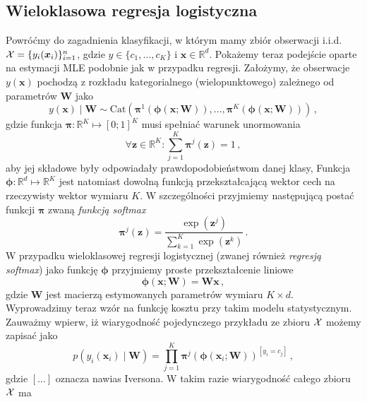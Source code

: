 \documentclass{myclass}
\numberwithin{equation}{subsection}
\begin{document}
\subsection{Wieloklasowa regresja logistyczna}

Powróćmy do zagadnienia klasyfikacji, w którym mamy zbiór obserwacji i.i.d. \(\mathcal{X} =
\{y_i(\bm{x}_i)\}_{i=1}^n\), gdzie \(y \in \{c_1,\ldots,c_K\}\) i \(\bm{x} \in \mathbb{R}^d\).
Pokażemy teraz podejście oparte na estymacji MLE podobnie jak w przypadku regresji. Założymy, że
obserwacje \(y(\bm{x})\) pochodzą z rozkładu kategorialnego (wielopunktowego) zależnego od
parametrów \(\bm{W}\) jako
\begin{equation}
    y(\bm{x}) \mid \bm{W} \sim \mathrm{Cat}\left(\bm{\pi}^1(\bm{\phi}(\bm{x}; \bm{W})), \ldots, \bm{\pi}^K(\bm{\phi}(\bm{x}; \bm{W}))\right)\,,
\end{equation}
gdzie funkcja \(\bm{\pi}: \mathbb{R}^K \mapsto [0;1]^K\) musi spełniać warunek unormowania
\begin{equation*}
    \forall \bm{z}\in\mathbb{R}^K: \sum_{j=1}^K \bm{\pi}^j(\bm{z}) = 1\,,
\end{equation*}
aby jej składowe były odpowiadały prawdopodobieństwom danej klasy, Funkcja \(\bm{\phi}: \mathbb{R}^d
\mapsto \mathbb{R}^K\) jest natomiast dowolną funkcją przekształcającą wektor cech na rzeczywisty
wektor wymiaru \(K\). W szczególności przyjmiemy następującą postać funkcji \(\bm{\pi}\) zwaną
\emph{funkcją softmax}
\begin{equation}\boxed{
    \bm{\pi}^j(\bm{z}) = \frac{\exp\left(\bm{z}^j\right)}{\sum_{k=1}^K \exp\left(\bm{z}^k\right)}\,.
}\end{equation}
W przypadku wieloklasowej regresji logistycznej (zwanej również \emph{regresją softmax}) jako
funkcję \(\bm{\phi}\) przyjmiemy proste przekształcenie liniowe
\begin{equation}
    \bm{\phi}(\bm{x}; \bm{W}) = \bm{W}\bm{x}\,,
\end{equation} 
gdzie \(\bm{W}\) jest macierzą estymowanych parametrów wymiaru \(K \times d\). Wyprowadzimy teraz
wzór na funkcję kosztu przy takim modelu statystycznym. Zauważmy wpierw, iż wiarygodność
pojedynczego przykładu ze zbioru \(\mathcal{X}\) możemy zapisać jako
\begin{equation}
    p(y_i(\bm{x}_i) \mid \bm{W}) = \prod_{j=1}^K \bm{\pi}^j\left(\bm{\phi}(\bm{x}_i; \bm{W})\right)^{[y_i = c_j]}\,,
\end{equation}
gdzie \([\ldots]\) oznacza nawias Iversona. W takim razie wiarygodność całego zbioru \(\mathcal{X}\) ma
\end{document}
